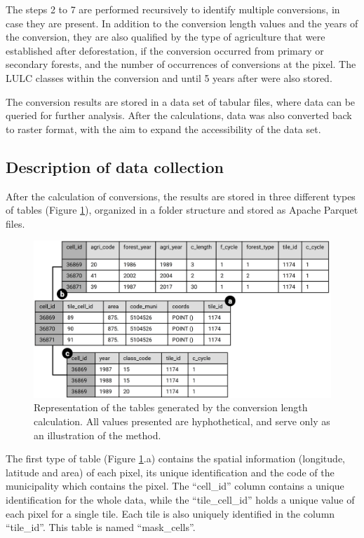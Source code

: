 \documentclass[essd, manuscript]{copernicus}
\begin{document}
The steps 2 to 7 are performed recursively to identify multiple conversions, in case they are present.
In addition to the conversion length values and the years of the conversion, they are also qualified by the type of agriculture that were established after deforestation, if the conversion occurred from primary or secondary forests, and the number of occurrences of conversions at the pixel.
The LULC classes within the conversion and until 5 years after were also stored.

The conversion results are stored in a data set of tabular files, where data can be queried for further analysis.
After the calculations, data was also converted back to raster format, with the aim to expand the accessibility of the data set.

\subsection{Description of data collection}

After the calculation of conversions, the results are stored in three different types of tables (Figure \ref{fig:tables-plot}), organized in a folder structure and stored as Apache Parquet files.

\begin{figure}[h]
\includegraphics[width=17cm]{figs/tables_scheme} \caption{ Representation of the tables generated by the conversion length calculation. All values presented are hyphothetical, and serve only as an illustration of the method.}\label{fig:tables-plot}
\end{figure}

The first type of table (Figure \ref{fig:tables-plot}.a) contains the spatial information (longitude, latitude and area) of each pixel, its unique identification and the code of the municipality which contains the pixel.
The ``cell\_id'' column contains a unique identification for the whole data, while the ``tile\_cell\_id'' holds a unique value of each pixel for a single tile.
Each tile is also uniquely identified in the column ``tile\_id''.
This table is named ``mask\_cells''.
\end{document}
